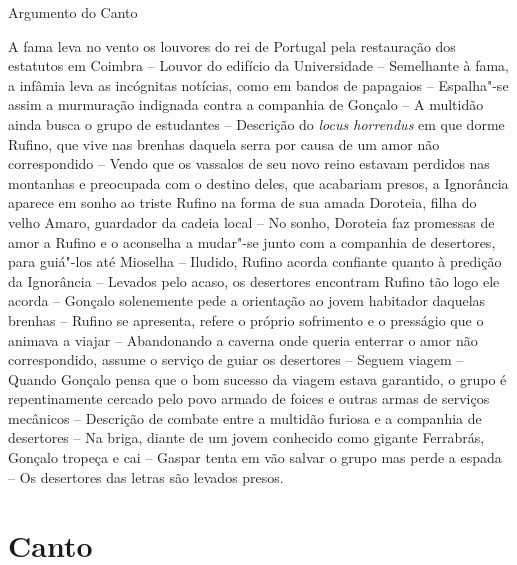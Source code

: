 \mbox{}\vfill
\thispagestyle{empty}
\noindent Argumento do Canto 
\medskip

{\footnotesize\noindent A fama leva no vento os louvores do rei de Portugal pela restauração dos
estatutos em Coimbra -- Louvor do edifício da Universidade -- Semelhante
à fama, a infâmia leva as incógnitas notícias, como em bandos de papagaios
-- Espalha"-se assim a murmuração indignada contra a companhia de Gonçalo --
A multidão ainda busca o grupo de estudantes -- Descrição do \textit{locus
horrendus} em que dorme Rufino, que vive nas brenhas daquela serra por causa
de um amor não correspondido -- Vendo que os vassalos de seu novo reino
estavam perdidos nas montanhas e preocupada com o destino deles, que acabariam
presos, a Ignorância aparece em sonho ao triste Rufino na forma de sua amada
Doroteia, filha do velho Amaro, guardador da cadeia local -- No sonho,
Doroteia faz promessas de amor a Rufino e o aconselha a mudar"-se junto com
a companhia de desertores, para guiá"-los até Mioselha -- Iludido, Rufino
acorda confiante quanto à predição da Ignorância -- Levados pelo acaso,
os desertores encontram Rufino tão logo ele acorda -- Gonçalo solenemente
pede a orientação ao jovem habitador daquelas brenhas -- Rufino se apresenta,
refere o próprio sofrimento e o presságio que o animava a viajar -- Abandonando
a caverna onde queria enterrar o amor não correspondido, assume o serviço de
guiar os desertores --  Seguem viagem -- Quando Gonçalo pensa que o bom sucesso 
da viagem estava garantido, o grupo é repentinamente cercado pelo povo armado
de foices e outras armas de serviços mecânicos -- Descrição de combate entre
a multidão furiosa e a companhia de desertores -- Na briga, diante de um jovem
conhecido como gigante Ferrabrás, Gonçalo tropeça e cai -- Gaspar tenta em vão
salvar o grupo mas perde a espada -- Os desertores das letras são levados presos.}


\chapter{Canto }


